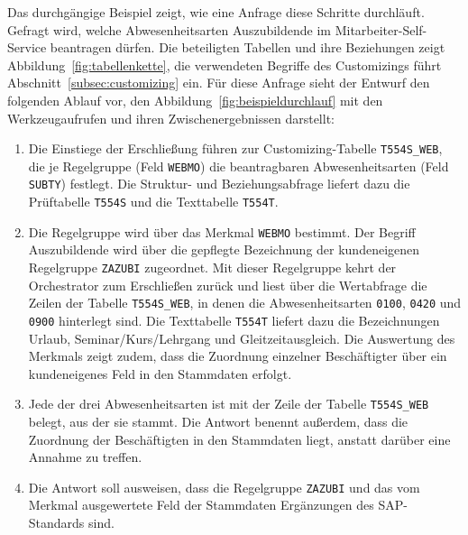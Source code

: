 Das durchgängige Beispiel zeigt, wie eine Anfrage diese Schritte durchläuft. Gefragt wird, welche Abwesenheitsarten Auszubildende im Mitarbeiter-Self-Service beantragen dürfen. Die beteiligten Tabellen und ihre Beziehungen zeigt Abbildung~\ref{fig:tabellenkette}, die verwendeten Begriffe des Customizings führt Abschnitt~\ref{subsec:customizing} ein. Für diese Anfrage sieht der Entwurf den folgenden Ablauf vor, den Abbildung~\ref{fig:beispieldurchlauf} mit den Werkzeugaufrufen und ihren Zwischenergebnissen darstellt:
\begin{enumerate}
	\item Die Einstiege der Erschließung führen zur Customizing-Tabelle \texttt{T554S\_WEB}, die je Regelgruppe (Feld \texttt{WEBMO}) die beantragbaren Abwesenheitsarten (Feld \texttt{SUBTY}) festlegt. Die Struktur- und Beziehungsabfrage liefert dazu die Prüftabelle \texttt{T554S} und die Texttabelle \texttt{T554T}.
	\schrittpfeil
	\item Die Regelgruppe wird über das Merkmal \texttt{WEBMO} bestimmt. Der Begriff \glqq Auszubildende\grqq{} wird über die gepflegte Bezeichnung der kundeneigenen Regelgruppe \texttt{ZAZUBI} zugeordnet. Mit dieser Regelgruppe kehrt der Orchestrator zum Erschließen zurück und liest über die Wertabfrage die Zeilen der Tabelle \texttt{T554S\_WEB}, in denen die Abwesenheitsarten \texttt{0100}, \texttt{0420} und \texttt{0900} hinterlegt sind. Die Texttabelle \texttt{T554T} liefert dazu die Bezeichnungen Urlaub, Seminar/Kurs/Lehrgang und Gleitzeitausgleich. Die Auswertung des Merkmals zeigt zudem, dass die Zuordnung einzelner Beschäftigter über ein kundeneigenes Feld in den Stammdaten erfolgt.
	\schrittpfeil
	\item Jede der drei Abwesenheitsarten ist mit der Zeile der Tabelle \texttt{T554S\_WEB} belegt, aus der sie stammt. Die Antwort benennt außerdem, dass die Zuordnung der Beschäftigten in den Stammdaten liegt, anstatt darüber eine Annahme zu treffen.
	\schrittpfeil
	\item Die Antwort soll ausweisen, dass die Regelgruppe \texttt{ZAZUBI} und das vom Merkmal ausgewertete Feld der Stammdaten Ergänzungen des SAP-Standards sind.
\end{enumerate}
